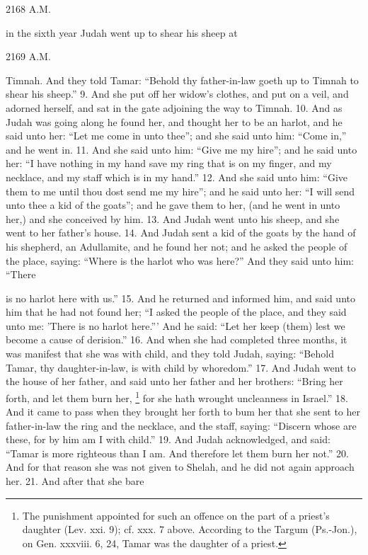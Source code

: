 2168 A.M.

in the sixth year Judah went up to shear his sheep at

2169 A.M.

Timnah. And they told Tamar: ``Behold thy father-in-law goeth up to Timnah to shear his sheep.'' 9. And she put off her widow's clothes, and put on a veil, and adorned herself, and sat in the gate adjoining the way to Timnah. 10. And as Judah was going along he found her, and thought her to be an harlot, and he said unto her: ``Let me come in unto thee''; and she said unto him: ``Come in,'' and he went in. 11. And she said unto him: ``Give me my hire''; and he said unto her: ``I have nothing in my hand save my ring that is on my finger, and my necklace, and my staff which is in my hand.'' 12. And she said unto him: ``Give them to me until thou dost send me my hire''; and he said unto her: ``I will send unto thee a kid of the goats''; and he gave them to her, (and he went in unto her,) and she conceived by him. 13. And Judah went unto his sheep, and she went to her father's house. 14. And Judah sent a kid of the goats by the hand of his shepherd, an Adullamite, and he found her not; and he asked the people of the place, saying: ``Where is the harlot who was here?'' And they said unto him: ``There

is no harlot here with us.'' 15. And he returned and informed him, and said unto him that he had not found her; ``I asked the people of the place, and they said unto me: 'There is no harlot here.''' And he said: ``Let her keep (them) lest we become a cause of derision.'' 16. And when she had completed three months, it was manifest that she was with child, and they told Judah, saying: ``Behold Tamar, thy daughter-in-law, is with child by whoredom.'' 17. And Judah went to the house of her father, and said unto her father and her brothers: ``Bring her forth, and let them burn her, \footnote{The punishment appointed for such an offence on the part of a priest's daughter (Lev. xxi. 9); cf. xxx. 7 above. According to the Targum (Ps.-Jon.), on Gen. xxxviii. 6, 24, Tamar was the daughter of a priest.} for she hath wrought uncleanness in Israel.'' 18. And it came to pass when they brought her forth to bum her that she sent to her father-in-law the ring and the necklace, and the staff, saying: ``Discern whose are these, for by him am I with child.'' 19. And Judah acknowledged, and said: ``Tamar is more righteous than I am. And therefore let them burn her not.'' 20. And for that reason she was not given to Shelah, and he did not again approach her. 21. And after that she bare

